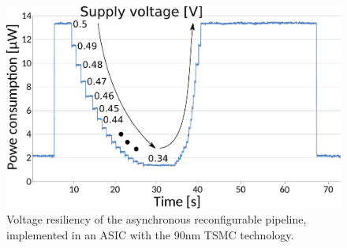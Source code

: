 \documentclass[conference]{IEEEtran}
\begin{document}
\begin{figure}[ht!]
\begin{center}
	\includegraphics[width=\linewidth]{FIG/ope-chip.pdf}
	\caption{Voltage resiliency of the asynchronous reconfigurable pipeline, implemented in
	an ASIC with the 90nm TSMC technology.}
	\label{fig:voltage-resiliency}
\end{center}
\end{figure}

%
%

\end{document}
